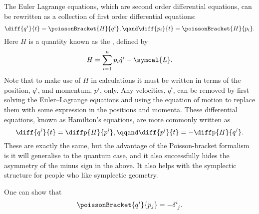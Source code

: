 \documentclass[fleqn]{NotesClass}
\newcommand{\lagrangian}{\symcal{L}}
\begin{document}
    The Euler Lagrange equations, which are second order differential equations, can be rewritten as a collection of first order differential equations:
    \begin{equation}
        \diff{q^i}{t} = \poissonBracket{H}{q^i}, \qand \diff{p_i}{t} = \poissonBracket{H}{p_i}.
    \end{equation}
    Here \(H\) is a quantity known as the , defined by
    \begin{equation}
        H = \sum_{i=1}^n p_i \dot{q}^i - \lagrangian.
    \end{equation}
    Note that to make use of \(H\) in calculations it must be written in terms of the position, \(q^i\), and momentum, \(p^i\), only.
    Any velocities, \(\dot{q}^i\), can be removed by first solving the Euler--Lagrange equations and using the equation of motion to replace them with some expression in the positions and momenta.
    These differential equations, known as Hamilton's equations, are more commonly written as
    \begin{equation}
        \diff{q^i}{t} = \diffp{H}{p^i}, \qqand \diff{p^i}{t} = -\diffp{H}{q^i}.
    \end{equation}
    These are exactly the same, but the advantage of the Poisson-bracket formalism is it will generalise to the quantum case, and it also successfully hides the asymmetry of the minus sign in the above.
    It also helps with the symplectic structure for people who like symplectic geometry.
    
    One can show that
    \begin{equation}
        \poissonBracket{q^i}{p_j} = -\tensor{\delta}{^i_j}.
    \end{equation}
    
\end{document}
